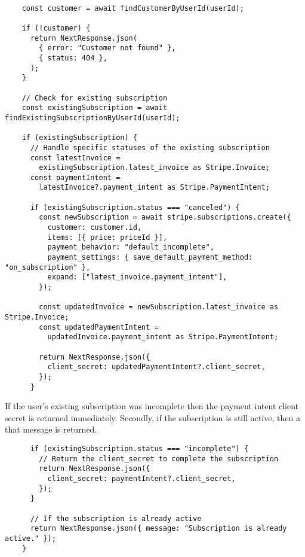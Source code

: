\documentclass[]{project_report}
\begin{document}
\begin{verbatim}

    const customer = await findCustomerByUserId(userId);

    if (!customer) {
      return NextResponse.json(
        { error: "Customer not found" },
        { status: 404 },
      );
    }
    
    // Check for existing subscription
    const existingSubscription = await findExistingSubscriptionByUserId(userId);

    if (existingSubscription) {
      // Handle specific statuses of the existing subscription
      const latestInvoice =
        existingSubscription.latest_invoice as Stripe.Invoice;
      const paymentIntent =
        latestInvoice?.payment_intent as Stripe.PaymentIntent;

      if (existingSubscription.status === "canceled") {
        const newSubscription = await stripe.subscriptions.create({
          customer: customer.id,
          items: [{ price: priceId }],
          payment_behavior: "default_incomplete",
          payment_settings: { save_default_payment_method: "on_subscription" },
          expand: ["latest_invoice.payment_intent"],
        });

        const updatedInvoice = newSubscription.latest_invoice as Stripe.Invoice;
        const updatedPaymentIntent =
          updatedInvoice.payment_intent as Stripe.PaymentIntent;

        return NextResponse.json({
          client_secret: updatedPaymentIntent?.client_secret,
        });
      }

\end{verbatim}
If the user's existing subscription was incomplete then the payment intent client secret is returned immediately. Secondly, if the subscription is still active, then a that message is returned.

\begin{verbatim}
      if (existingSubscription.status === "incomplete") {
        // Return the client_secret to complete the subscription
        return NextResponse.json({
          client_secret: paymentIntent?.client_secret,
        });
      }

      // If the subscription is already active
      return NextResponse.json({ message: "Subscription is already active." });
    }
\end{verbatim}
\end{document}
